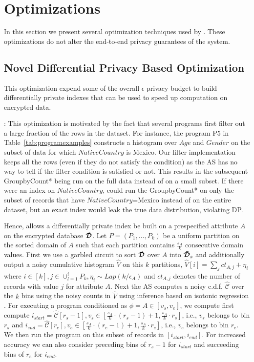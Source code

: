\section{\system Optimizations}\label{sec:optimization}
In this section we present several optimization techniques used by \system. These optimizations do not alter the end-to-end privacy guarantees of the system. 

\subsection{Novel \system Differential Privacy Based Optimization}\label{sec:dp_optimization}
This optimization expend some of the overall $\epsilon$ privacy budget to build differentially private indexes that can be used to speed up computation on encrypted data.


: This optimization is motivated by the fact that several programs first filter out a large fraction of the rows in the dataset. For instance, the program  P5 in Table~\ref{tab:programexamples} constructs a histogram over $Age$ and $Gender$ on the subset of data for which $NativeCountry$ is Mexico. Our filter implementation keeps all the rows (even if they do not satisfy the condition) as the \textsf{AS} has no way to tell if the filter condition is satisfied or not. This results in the subsequent GroupbyCount* being run on the full data instead of on a small subset. If there were an index on $NativeCountry$,  \system could run the GroupbyCount* on only the subset of records that have $NativeCountry$=Mexico instead of on the entire dataset, but an exact index would leak the true data distribution, violating DP. 

Hence, \system allows a differentially private index be built on a prespecified attribute $A$ on the encrypted database $\boldsymbol{\tilde{\mathcal{D}}}$.   Let $P=(P_1,\ldots,P_k)$ be a uniform partition on the sorted domain of $A$ such that each partition contains $\frac{s_A}{k}$ consecutive domain values. First we use a garbled circuit to sort $\boldsymbol{\tilde{\mathcal{D}}}$ over $A$ into $\boldsymbol{\tilde{\mathcal{D}}}_s$ and additionally output a noisy cumulative histogram $\hat{V}$ on this $k$ partitions, $\hat{V}[i]=\sum_j ct_{A,j}+\eta_i$ where $i \in [k], j \in \cup_{l=1}^i P_k, \eta_i\sim Lap(k/\epsilon_A)$ and $ct_{A,j}$ denotes the number of records with value $j$ for attribute $A$. 
Next the \textsf{AS} computes a noisy c.d.f, $\hat{\mathcal{C}}$ over the $k$ bins using the noisy counts in $\hat{V}$ using inference based on isotonic regression \cite{cdf}. For executing a program conditioned as $\phi=A \in [v_s,v_e]$, we compute first compute $i_{start}=\hat{\mathcal{C}}[r_s-1], v_s \in [\frac{s_A}{k}\cdot(r_s-1)+1,\frac{s_A}{k}\cdot r_s]$, i.e., $v_s$ belongs to bin $r_s$   and  $i_{end}=\hat{\mathcal{C}}[r_e], v_e \in [\frac{s_A}{k}\cdot(r_e-1)+1,\frac{s_A}{k}\cdot r_e]$, i.e., $v_e$ belongs to bin $r_e$. We then run the program on this subset of records in $[i_{start},i_{end}]$. For increased accuracy we can also consider preceding bins of $r_s-1$ for $i_{start}$ and succeeding bins of $r_e$ for $i_{end}$.

